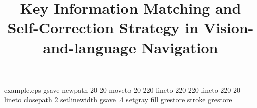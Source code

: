 %
%
%
%
%
\begin{filecontents*}{example.eps}
gsave
newpath
	20 20 moveto
	20 220 lineto
	220 220 lineto
	220 20 lineto
closepath
2 setlinewidth
gsave
	.4 setgray fill
grestore
stroke
grestore
\end{filecontents*}
%
\RequirePackage{fix-cm}
%
\documentclass[smallcondensed]{svjour3}     %
%
\smartqed  %
%
\usepackage{algorithmic}
\usepackage{amsmath,amssymb,amsfonts}
\usepackage{enumerate}
\usepackage{wrapfig}
\usepackage{graphicx}
\usepackage{appendix}
\usepackage{graphicx}
\usepackage{amsmath}
\usepackage{caption}
\usepackage{subfigure}
\usepackage{makecell}
\usepackage{multirow}
\usepackage{booktabs}
\usepackage{threeparttable}
\usepackage{geometry}
\usepackage{float}
\usepackage{indentfirst}
\usepackage[colorlinks,
linkcolor=blue,
anchorcolor=black,
citecolor=blue]{hyperref}
\geometry{top=2.5cm,bottom=2.5cm}
%
%
%
%
%

	
\title{Key Information Matching and Self-Correction Strategy in Vision-and-language Navigation%
}
	
